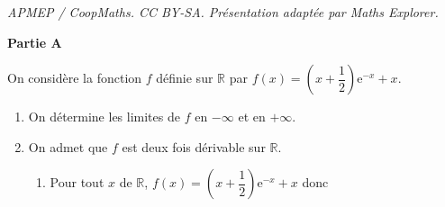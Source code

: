 \documentclass[10pt]{article}
\providecommand{\R}{\mathbb{R}}
\providecommand{\e}{{\mathrm{e}}}
\providecommand{\ds}{\displaystyle}
\begin{document}
\noindent\textit{APMEP / CoopMaths. CC BY-SA. Présentation adaptée par Maths Explorer.}\par\medskip
\medskip

\textbf{Partie A}

\medskip

On considère la fonction $f$ définie sur $\R$ par
$f(x) = \left(x + \dfrac12\right)\e^{-x} + x.$



\begin{enumerate}
\item On détermine les limites de $f$ en $- \infty$ et en $+ \infty$.


\item On admet que $f$ est deux fois dérivable sur $\R$.
	\begin{enumerate}
		\item 
Pour tout $x$ de $\R$, $f(x)= \left (x+\dfrac{1}{2}\right )\e^{-x}  +x$ donc


\end{enumerate}
\end{enumerate}
\end{document}

